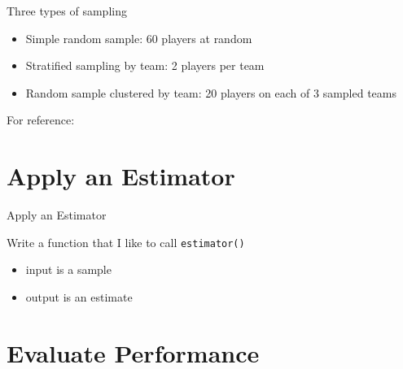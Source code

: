 \documentclass{beamer}
\newcommand\bref[2]{\href{#1}{\color{blue}{#2}}}
\begin{document}
\begin{frame}{Three types of sampling} \pause
\begin{itemize}
\item Simple random sample: 60 players at random \pause
\item Stratified sampling by team: 2 players per team \pause
{}
\item Random sample clustered by team: 20 players on each of 3 sampled teams
\end{itemize}
For reference:  \bref{https://www150.statcan.gc.ca/n1/edu/power-pouvoir/ch13/prob/5214899-eng.htm}{reading}
\end{frame}

\section{Apply an Estimator}

\begin{frame}{Apply an Estimator}

Write a function that I like to call \texttt{estimator()}
\begin{itemize}
\item input is a sample
\item output is an estimate
\end{itemize}

\end{frame}


\section{Evaluate Performance}

\end{document}
